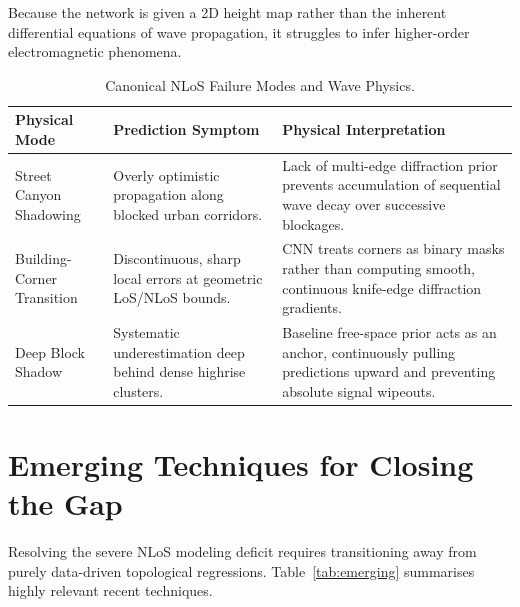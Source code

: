\documentclass[11pt,a4paper]{article}
\begin{document}
Because the network is given a 2D height map rather than the inherent differential equations of wave propagation, it struggles to infer higher-order electromagnetic phenomena. 

\begin{table}[h!]
\centering
\caption{Canonical NLoS Failure Modes and Wave Physics.}
\label{tab:failuremodes}
\begin{tabularx}{\textwidth}{lXX}
\toprule
\textbf{Physical Mode} & \textbf{Prediction Symptom} & \textbf{Physical Interpretation} \\
\midrule
Street Canyon Shadowing & Overly optimistic propagation along blocked urban corridors. & Lack of multi-edge diffraction prior prevents accumulation of sequential wave decay over successive blockages. \\
Building-Corner Transition & Discontinuous, sharp local errors at geometric LoS/NLoS bounds. & CNN treats corners as binary masks rather than computing smooth, continuous knife-edge diffraction gradients. \\
Deep Block Shadow & Systematic underestimation deep behind dense highrise clusters. & Baseline free-space prior acts as an anchor, continuously pulling predictions upward and preventing absolute signal wipeouts. \\
\bottomrule
\end{tabularx}
\end{table}

\section{Emerging Techniques for Closing the Gap}
\label{sec:emerging}

Resolving the severe NLoS modeling deficit requires transitioning away from purely data-driven topological regressions. Table~\ref{tab:emerging} summarises highly relevant recent techniques.
\end{document}
